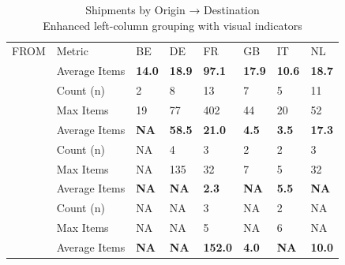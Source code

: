 \documentclass[
  american,
  10,
  a4paper,
]{book}
\theoremstyle{definition}
\theoremstyle{remark}
\begin{document}
\begin{table}
\caption*{
{\large Shipments by Origin → Destination} \\ 
{\small Enhanced left-column grouping with visual indicators}
} 
\fontsize{12.0pt}{14.4pt}\selectfont
\begin{tabular*}{\linewidth}{@{\extracolsep{\fill}}>{\centering\arraybackslash}p{\dimexpr 60.00pt -2\tabcolsep-1.5\arrayrulewidth}>{\centering\arraybackslash}p{\dimexpr 90.00pt -2\tabcolsep-1.5\arrayrulewidth}>{\centering\arraybackslash}p{\dimexpr 60.00pt -2\tabcolsep-1.5\arrayrulewidth}>{\centering\arraybackslash}p{\dimexpr 60.00pt -2\tabcolsep-1.5\arrayrulewidth}>{\centering\arraybackslash}p{\dimexpr 60.00pt -2\tabcolsep-1.5\arrayrulewidth}>{\centering\arraybackslash}p{\dimexpr 60.00pt -2\tabcolsep-1.5\arrayrulewidth}>{\centering\arraybackslash}p{\dimexpr 60.00pt -2\tabcolsep-1.5\arrayrulewidth}>{\centering\arraybackslash}p{\dimexpr 60.00pt -2\tabcolsep-1.5\arrayrulewidth}}
\toprule
 &  & \multicolumn{6}{>{\centering\arraybackslash}m{\dimexpr 360.00pt -2\tabcolsep-1.5\arrayrulewidth}}{TO} \\ 
\cmidrule(lr){3-8}
FROM & Metric & BE & DE & FR & GB & IT & NL \\ 
\midrule\addlinespace[2.5pt]
{\bfseries \cellcolor[HTML]{ECF0F1}{\textcolor[HTML]{2C3E50}{3P}}} & Average Items & {\bfseries 14.0} & {\bfseries 18.9} & {\bfseries 97.1} & {\bfseries 17.9} & {\bfseries 10.6} & {\bfseries 18.7} \\ 
{} & {Count (n)} & {2} & {8} & {13} & {7} & {5} & {11} \\ 
{} & {Max Items} & {19} & {77} & {402} & {44} & {20} & {52} \\ 
{\bfseries \cellcolor[HTML]{ECF0F1}{\textcolor[HTML]{2C3E50}{DE}}} & Average Items & {\bfseries NA} & {\bfseries 58.5} & {\bfseries 21.0} & {\bfseries 4.5} & {\bfseries 3.5} & {\bfseries 17.3} \\ 
{} & {Count (n)} & {NA} & {4} & {3} & {2} & {2} & {3} \\ 
{} & {Max Items} & {NA} & {135} & {32} & {7} & {5} & {32} \\ 
{\bfseries \cellcolor[HTML]{ECF0F1}{\textcolor[HTML]{2C3E50}{ES}}} & Average Items & {\bfseries NA} & {\bfseries NA} & {\bfseries 2.3} & {\bfseries NA} & {\bfseries 5.5} & {\bfseries NA} \\ 
{} & {Count (n)} & {NA} & {NA} & {3} & {NA} & {2} & {NA} \\ 
{} & {Max Items} & {NA} & {NA} & {5} & {NA} & {6} & {NA} \\ 
{\bfseries \cellcolor[HTML]{ECF0F1}{\textcolor[HTML]{2C3E50}{FR}}} & Average Items & {\bfseries NA} & {\bfseries NA} & {\bfseries 152.0} & {\bfseries 4.0} & {\bfseries NA} & {\bfseries 10.0} \\ 

\end{tabular*}
\end{table}
\end{document}
